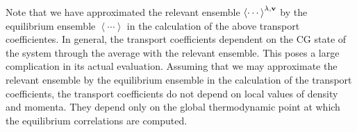 \documentclass[b5paper,openright,11pt]{book}
\newcommand{\llangle}{\left\langle}
\newcommand{\rrangle}{\right\rangle}
\begin{document}
Note that we have approximated the relevant ensemble $\llangle\cdots\rrangle^{\lambda,{\bf v}}$ by the equilibrium ensemble $\llangle\cdots\rrangle$ in the calculation of the above transport coefficientes. 
In  general, the transport coefficients
dependent on the CG state of  the system through the average with the
relevant  ensemble.   This
poses a large  complication in its actual evaluation. Assuming that  we may approximate the relevant ensemble
by the equilibrium ensemble
in  the   calculation   of  the   transport
coefficients, the
transport coefficients  do not depend  on local values of  density and
momenta.  They depend only on  the global thermodynamic point at which
the equilibrium correlations are computed.


\end{document}

